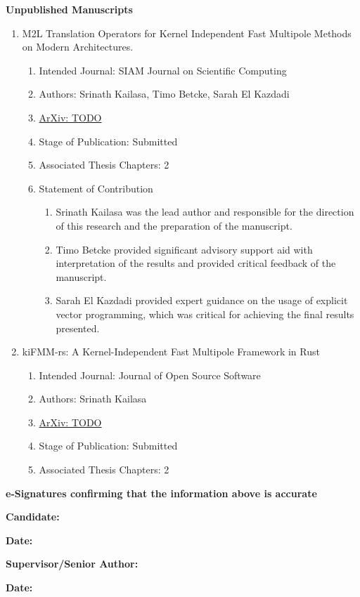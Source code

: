 \textbf{Unpublished Manuscripts}

\begin{enumerate}
    \item M2L Translation Operators for Kernel Independent Fast Multipole Methods on Modern Architectures.
    \begin{enumerate}[label=\alph*)]
      \item Intended Journal: SIAM Journal on Scientific Computing
      \item Authors: Srinath Kailasa, Timo Betcke, Sarah El Kazdadi
      \item  \href{https://doi.org/10.48550/arXiv.2303.08394}{ArXiv: TODO}
      \item Stage of Publication: Submitted
      \item Associated Thesis Chapters: 2
      \item Statement of Contribution
      \begin{enumerate}
        \item Srinath Kailasa was the lead author and responsible for the direction of this research and the preparation of the manuscript.
        \item Timo Betcke provided significant advisory support aid with interpretation of the results and provided critical feedback of the manuscript.
        \item Sarah El Kazdadi provided expert guidance on the usage of explicit vector programming, which was critical for achieving the final results presented.
      \end{enumerate}
    \end{enumerate}

    \item kiFMM-rs: A Kernel-Independent Fast Multipole Framework in Rust
    \begin{enumerate}[label=\alph*)]
      \item Intended Journal: Journal of Open Source Software
      \item Authors: Srinath Kailasa
      \item  \href{https://doi.org/10.48550/arXiv.2303.08394}{ArXiv: TODO}
      \item Stage of Publication: Submitted
      \item Associated Thesis Chapters: 2
    \end{enumerate}

\end{enumerate}

\textbf{e-Signatures confirming that the information above is accurate}

\hspace*{10mm}

\textbf{Candidate:}

\textbf{Date:}

\hspace*{10mm}

\textbf{Supervisor/Senior Author:}

\textbf{Date:}